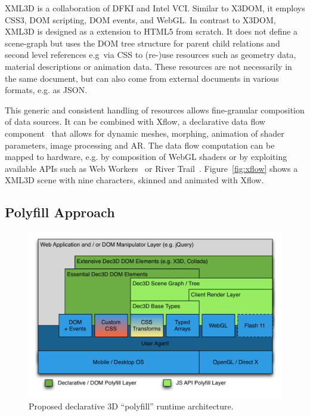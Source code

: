 \documentclass{acmsiggraph}
\begin{document}
XML3D \cite{Sons2010} is a collaboration of DFKI and Intel VCI. Similar to X3DOM, it employs CSS3, DOM scripting, DOM events, and WebGL. In contrast to X3DOM, XML3D is designed as a extension to HTML5 from scratch. It does not define a scene-graph but uses the DOM tree structure for parent child relations and second level references e.g\ via CSS to (re-)use resources such as geometry data, material descriptions or animation data. These resources are not necessarily in the same document, but can also come from external documents in various formats, e.g. as JSON. %

This generic and consistent handling of resources allows fine-granular composition of data sources. It can be combined with Xflow, a declarative data flow component~\cite{KleinSJRSB12} that allows for dynamic meshes, morphing, animation of shader parameters, image processing and AR. The data flow computation can be mapped to hardware, e.g. by composition of WebGL shaders or by exploiting available APIs such as Web Workers~\cite{w3c:webworkers} or River Trail~\cite{Herhut:2012}. Figure~\ref{fig:xflow} shows a XML3D scene with nine characters, skinned and animated with Xflow.



\subsection{Polyfill Approach}

\begin{figure}
  \centering
  \includegraphics[width=1.0\columnwidth]{images/Dec3D-Architecture.png}
  \caption{Proposed declarative 3D ``polyfill'' runtime architecture.}
  \label{fig:polyArch}
  \vspace{-0.2cm}
\end{figure}
\end{document}
